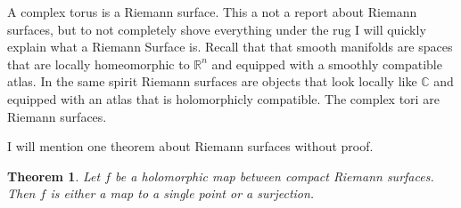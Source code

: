 \documentclass[a4paper]{article}
\theoremstyle{theoremdd}
\newtheorem{theorem}{Theorem}[section]
\theoremstyle{definitiondd}
\theoremstyle{remarkdd}
\newcommand{\C}{\mathbb{C}}
\newcommand{\R}{\mathbb{R}}
\begin{document}
A complex torus is a Riemann surface. This a not a report about Riemann surfaces, but to not completely shove everything under the rug I will quickly explain what a Riemann Surface is.
Recall that that smooth manifolds are spaces that are locally homeomorphic to $\R^{n}$ and equipped with a smoothly compatible atlas. 
In the same spirit Riemann surfaces are objects that look locally like $\C$ and equipped with an atlas that is holomorphicly compatible.
The complex tori are Riemann surfaces. 

I will mention one theorem about Riemann surfaces without proof. 
\begin{theorem}
	Let $f$ be a holomorphic map between compact Riemann surfaces. Then $f$ is either a map to a single point or a surjection.
\end{theorem}
\end{document}
